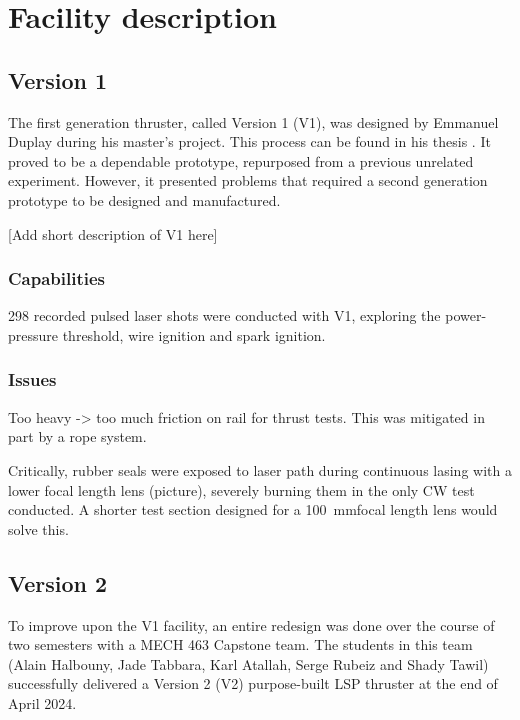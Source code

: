 \chapter{Facility description}

    \section{Version 1} \label{sec:design_v1}

        The first generation thruster, called Version 1 (V1), was designed by Emmanuel Duplay during his master's project. This process can be found in his thesis \cite{duplayArgonLaserPlasmaThruster2024a}. It proved to be a dependable prototype, repurposed from a previous unrelated experiment. However, it presented problems that required a second generation prototype to be designed and manufactured.

        [Add short description of V1 here]

        \subsection{Capabilities}

            298 recorded pulsed laser shots were conducted with V1, exploring the power-pressure threshold, wire ignition and spark ignition.

        \subsection{Issues}

            Too heavy -> too much friction on rail for thrust tests. This was mitigated in part by a rope system.

            Critically, rubber seals were exposed to laser path during continuous lasing with a lower focal length lens (picture), severely burning them in the only CW test conducted. A shorter test section designed for a \qty{100}{mm}focal length lens would solve this.







    \section{Version 2} \label{sec:design_v2}

        To improve upon the V1 facility, an entire redesign was done over the course of two semesters with a MECH 463 Capstone team. The students in this team (Alain Halbouny, Jade Tabbara, Karl Atallah, Serge Rubeiz and Shady Tawil) successfully delivered a Version 2 (V2) purpose-built LSP thruster at the end of April 2024.

